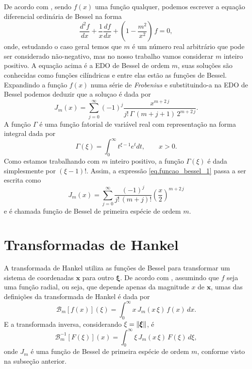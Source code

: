De acordo com \cite{butkov_88}, sendo $f(x)$ uma fun\c{c}\~ao qualquer, podemos escrever a equa\c{c}\~ao diferencial ordin\'aria de Bessel na forma
\begin{equation}
\frac{d^2f}{dx}+\frac{1}{x}\frac{df}{dx}+\left(1-\frac{m^2}{x^2} \right)\,f=0,
\end{equation}
onde, estudando o caso geral temos que $m$ \'e um n\'umero real arbitr\'ario que pode ser considerado n\~ao-negativo, mas no nosso trabalho vamos considerar $m$ inteiro positivo. A equa\c{c}\~ao acima \'e a EDO de Bessel de ordem $m$, suas solu\c{c}\~oes s\~ao conhecidas como fun\c{c}\~oes cil\'indricas e entre elas est\~ao as fun\c{c}\~oes de Bessel. Expandindo a fun\c{c}\~ao $f(x)$ numa s\'erie de \textit{Frobenius} e substituindo-a  na EDO de Bessel podemos deduzir que a solu\c{c}ao \'e dada por
\begin{equation}\label{eq.funcao_bessel_1}
J_m(x)=\sum_{j=0}^{\infty}(-1)^j\frac{x^{m+2\,j}}{j!\,\Gamma\,(m+j+1)\,2^{m+2\,j}}.
\end{equation}
A fun\c{c}\~ao $\Gamma$ \'e uma fun\c{c}\~ao fatorial de vari\'avel real com representa\c{c}\~ao na forma integral dada por
\begin{equation*}
\Gamma(\xi)=\int_0^\infty t^{\xi-1}e^tdt,\qquad x>0.
\end{equation*}
Como estamos trabalhando com $m$ inteiro positivo, a fun\c{c}\~ao $\Gamma(\xi)$ \'e dada simplesmente por $(\xi-1)!$. Assim, a express\~ao \ref{eq.funcao_bessel_1} passa a ser escrita como
\begin{equation}\label{eq.funcao_bessel_2}
J_m(x)=\sum_{j=0}^{\infty}\frac{(-1)^j}{j!\,(m+j)!}\left(\frac{x}{2}\right)^{m+2\,j}
\end{equation}
e \'e chamada fun\c{c}\~ao de Bessel de primeira esp\'ecie de ordem $m$.

\section{Transformadas de Hankel}\label{sec.trans_hankel}
A transformada de Hankel utiliza as fun\c{c}\~oes de Bessel para transformar um sistema de coordenadas $\mathbf{x}$ para outro $\pmb{\xi}$. De acordo com \cite{baruch_2013}, assumindo que $f$ seja uma fun\c{c}\~ao radial, ou seja, que depende apenas da magnitude $x$ de $\mathbf{x}$, umas das defini\c{c}\~oes da transformada de Hankel \'e dada por
\begin{equation*}
\mathcal{B}_m[f(x)](\xi)=\int_0^\infty x\,J_m(x\,\xi)\,f(x)\,dx.
\end{equation*}
E a transformada inversa, considerando $\xi=\lVert\pmb{\xi}\rVert$, \'e
\begin{equation*}
\mathcal{B}^{-1}_m[F(\xi)](x)=\int_0^\infty \xi\,J_m(x\,\xi)\,F(\xi)\,d\xi,
\end{equation*}
onde $J_m$ \'e uma fun\c{c}\~ao de Bessel de primeira esp\'ecie de ordem $m$, conforme visto na subse\c{c}\~ao anterior.










